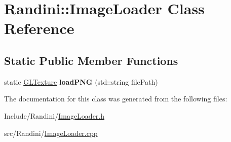 \hypertarget{classRandini_1_1ImageLoader}{
\section{Randini::ImageLoader Class Reference}
\label{classRandini_1_1ImageLoader}
}
\subsection*{Static Public Member Functions}
\begin{DoxyCompactItemize}
\item 
\hypertarget{classRandini_1_1ImageLoader_a9fcb5f4c32840bbd35f6f7d2850de900}{
static \hyperlink{structRandini_1_1GLTexture}{GLTexture} {\bfseries loadPNG} (std::string filePath)}
\label{classRandini_1_1ImageLoader_a9fcb5f4c32840bbd35f6f7d2850de900}

\end{DoxyCompactItemize}


The documentation for this class was generated from the following files:\begin{DoxyCompactItemize}
\item 
Include/Randini/\hyperlink{ImageLoader_8h}{ImageLoader.h}\item 
src/Randini/\hyperlink{ImageLoader_8cpp}{ImageLoader.cpp}\end{DoxyCompactItemize}
